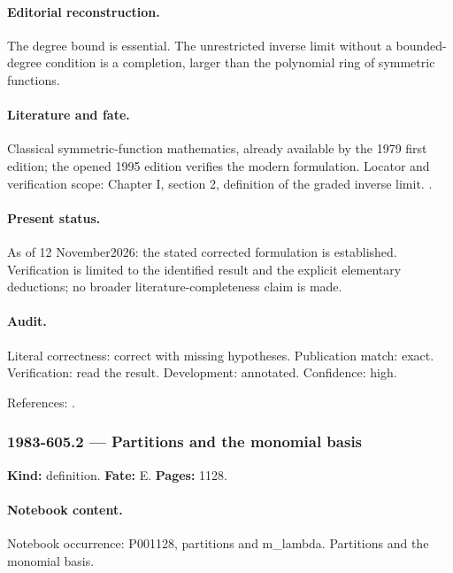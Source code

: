 \paragraph{Editorial reconstruction.} The degree bound is essential. The unrestricted inverse limit without a bounded-degree condition is a completion, larger than the polynomial ring of symmetric functions.

\paragraph{Literature and fate.} Classical symmetric-function mathematics, already available by the 1979 first edition; the opened 1995 edition verifies the modern formulation. Locator and verification scope: Chapter I, section 2, definition of the graded inverse limit. \cite{macdonald1995symmetric}.

\paragraph{Present status.} As of 12 November2026: the stated corrected formulation is established. Verification is limited to the identified result and the explicit elementary deductions; no broader literature-completeness claim is made.

\paragraph{Audit.} Literal correctness: correct with missing hypotheses. Publication match: exact. Verification: read the result. Development: annotated. Confidence: high.

\noindent References: \citep{macdonald1995symmetric}.\par

\subsubsection{1983-605.2 --- Partitions and the monomial basis}

\label{item:1983-605.2}

\noindent\textbf{Kind:} definition. \textbf{Fate:} E. \textbf{Pages:} 1128.\par

\paragraph{Notebook content.} Notebook occurrence: P001128, partitions and m_lambda. Partitions and the monomial basis.

